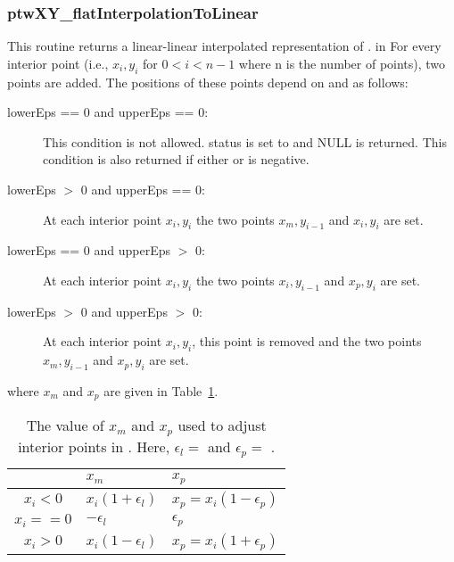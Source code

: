 \subsubsection{ptwXY\_flatInterpolationToLinear}
This routine returns a linear-linear interpolated representation of .
     in \noindent
For every interior point (i.e., $x_i,y_i$ for $0 < i < n - 1$ where n is the number of points), two points are added.
The positions of these points depend on  and  as follows:
\begin{description}
    \item[lowerEps ==  0 and upperEps ==  0:] This condition is not allowed. status is set to  and NULL is returned.
        This condition is also returned if either  or  is negative.
    \item[lowerEps $>$ 0 and upperEps ==  0:] At each interior point $x_i,y_i$ the two points $x_m,y_{i-1}$ and $x_i,y_i$ are set.
    \item[lowerEps ==  0 and upperEps $>$ 0:] At each interior point $x_i,y_i$ the two points $x_i,y_{i-1}$ and $x_p,y_i$ are set.
    \item[lowerEps $>$ 0 and upperEps $>$ 0:] At each interior point $x_i,y_i$, this point is removed and the two 
        points $x_m,y_{i-1}$ and $x_p,y_i$ are set.
\end{description}
where $x_m$ and $x_p$ are given in Table~\ref{flatInterpolationToLinear}.
\begin{table}
\begin{center}
\begin{tabular}{|c|l|l|}  \hline
                & $x_m$                    & $x_p$                          \\ \hline \hline
    $x_i <  0$  & $x_i ( 1 + \epsilon_l )$ & $x_p = x_i ( 1 - \epsilon_p )$ \\ \hline
    $x_i == 0$  & $ -\epsilon_l $          & $ \epsilon_p $                 \\ \hline
    $x_i >  0$  & $x_i ( 1 - \epsilon_l )$ & $x_p = x_i ( 1 + \epsilon_p )$ \\ \hline
\end{tabular}
\end{center}
\caption{The value of $x_m$ and $x_p$ used to adjust interior points in . 
    Here, $ \epsilon_l = $  and $ \epsilon_p = $ . \label{flatInterpolationToLinear}}
\end{table}


